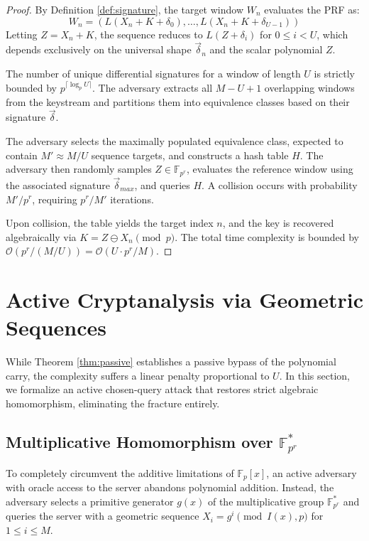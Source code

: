 \documentclass[runningheads]{llncs}
\begin{document}
\begin{proof}
By Definition \ref{def:signature}, the target window $W_n$ evaluates the PRF as:
\begin{equation*}
    W_n = \left( L(X_n + K + \delta_0), \dots, L(X_n + K + \delta_{U-1}) \right)
\end{equation*}
Letting $Z = X_n + K$, the sequence reduces to $L(Z + \delta_i)$ for $0 \leq i < U$, which depends exclusively on the universal shape $\vec{\delta}_n$ and the scalar polynomial $Z$.

The number of unique differential signatures for a window of length $U$ is strictly bounded by $p^{\lceil \log_p U \rceil}$. The adversary extracts all $M - U + 1$ overlapping windows from the keystream and partitions them into equivalence classes based on their signature $\vec{\delta}$. 

The adversary selects the maximally populated equivalence class, expected to contain $M' \approx M/U$ sequence targets, and constructs a hash table $H$. The adversary then randomly samples $Z \in \mathbb{F}_{p^r}$, evaluates the reference window using the associated signature $\vec{\delta}_{max}$, and queries $H$. A collision occurs with probability $M'/p^r$, requiring $p^r/M'$ iterations. 

Upon collision, the table yields the target index $n$, and the key is recovered algebraically via $K = Z \ominus X_n \pmod p$. The total time complexity is bounded by $\mathcal{O}(p^r / (M/U)) = \mathcal{O}(U \cdot p^r/M)$.
\end{proof}

\section{Active Cryptanalysis via Geometric Sequences}
While Theorem \ref{thm:passive} establishes a passive bypass of the polynomial carry, the complexity suffers a linear penalty proportional to $U$. In this section, we formalize an active chosen-query attack that restores strict algebraic homomorphism, eliminating the fracture entirely.

\subsection{Multiplicative Homomorphism over $\mathbb{F}_{p^r}^*$}
To completely circumvent the additive limitations of $\mathbb{F}_p[x]$, an active adversary with oracle access to the server abandons polynomial addition. Instead, the adversary selects a primitive generator $g(x)$ of the multiplicative group $\mathbb{F}_{p^r}^*$ and queries the server with a geometric sequence $X_i = g^i \pmod{I(x), p}$ for $1 \leq i \leq M$.
\end{document}
